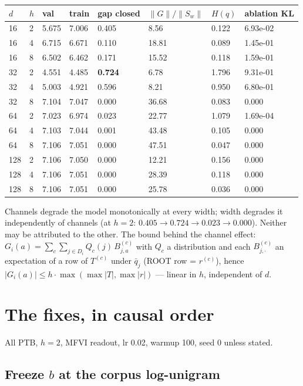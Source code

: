 \documentclass[10pt,a4paper]{article}
\newcommand{\msgu}{\ensuremath{\lVert G\rVert/\lVert S_w\rVert}}
\newcommand{\qbar}{\ensuremath{\bar q}}
\begin{document}
\begin{table}[h]\centering\footnotesize
\begin{tabular}{llllllll}
\toprule
$d$ & $h$ & val & train & gap closed & \msgu{} & $H(q)$ & ablation KL\\
\midrule
16 & 2 & 5.675 & 7.006 & 0.405 & 8.56 & 0.122 & 6.93e-02\\
16 & 4 & 6.715 & 6.671 & 0.110 & 18.81 & 0.089 & 1.45e-01\\
16 & 8 & 6.502 & 6.462 & 0.171 & 15.52 & 0.118 & 1.59e-01\\
32 & 2 & 4.551 & 4.485 & \textbf{0.724} & 6.78 & 1.796 & 9.31e-01\\
32 & 4 & 5.003 & 4.921 & 0.596 & 8.21 & 0.950 & 6.80e-01\\
32 & 8 & 7.104 & 7.047 & 0.000 & 36.68 & 0.083 & 0.000\\
64 & 2 & 7.023 & 6.974 & 0.023 & 22.77 & 1.079 & 1.69e-04\\
64 & 4 & 7.103 & 7.044 & 0.001 & 43.48 & 0.105 & 0.000\\
64 & 8 & 7.106 & 7.051 & 0.000 & 47.51 & 0.047 & 0.000\\
128 & 2 & 7.106 & 7.050 & 0.000 & 12.21 & 0.156 & 0.000\\
128 & 4 & 7.106 & 7.051 & 0.000 & 28.39 & 0.118 & 0.000\\
128 & 8 & 7.106 & 7.051 & 0.000 & 25.78 & 0.036 & 0.000\\
\bottomrule
\end{tabular}
\end{table}

Channels degrade the model monotonically at every width; width degrades it independently of
channels (at $h{=}2$: $0.405 \to 0.724 \to 0.023 \to 0.000$). Neither may be attributed to
the other. The bound behind the channel effect:
$G_i(a) = \sum_c \sum_{j\in D_i} Q_c(j)\, B^{(c)}_{j,a}$ with $Q_c$ a distribution and each
$B^{(c)}_{j,\cdot}$ an expectation of a row of $T^{(c)}$ under $\qbar_j$ (ROOT row =
$r^{(c)}$), hence $|G_i(a)| \le h \cdot \max(\max|T|, \max|r|)$ --- linear in $h$,
independent of $d$.

\section{The fixes, in causal order}

All PTB, $h=2$, MFVI readout, lr 0.02, warmup 100, seed 0 unless stated.

\subsection{Freeze $b$ at the corpus log-unigram}
\end{document}
